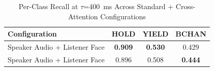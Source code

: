 \begin{table}[h]
\caption{Per-Class Recall at $\tau$=400~ms Across Standard + Cross-Attention Configurations}
\label{tab:recall_per_class_sca}
\small
\renewcommand{\arraystretch}{1.20}
\begin{tabular}{>{\raggedright\arraybackslash}p{4cm}ccc}
\toprule
Configuration & HOLD & YIELD & BCHAN \\
\midrule
Speaker Audio + Listener Face & \textbf{0.909} & \textbf{0.530} & 0.429 \\
Speaker Audio + Listener Face & 0.896 & 0.508 & \textbf{0.444} \\
\bottomrule
\end{tabular}
\end{table}
